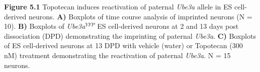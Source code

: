 \documentclass{beamer}
\begin{document}
\begin{frame}
\begin{columns}
{\begin{tikzpicture}[every label/.style={font=\Large\bfseries},pic/.style={inner sep=0pt}]
      \end{tikzpicture}
    }

    \begin{block}{\textbf{Figure 5.1}}
      Topotecan induces reactivation of paternal \emph{Ube3a} allele in ES cell-derived neurons. \textbf{A)} Boxplots of time course analysis of imprinted neurons (N = 10). \textbf{B)} Boxplots of \emph{Ube3a$^{YFP}$} ES cell-derived neurons at 2 and 13 days post dissociation (DPD) demonstrating the imprinting of paternal \emph{Ube3a}. \textbf{C)} Boxplots of ES cell-derived neurons at 13 DPD with vehicle (water) or Topotecan (300 nM) treatment demonstrating the reactivation of paternal \emph{Ube3a}. N = 15 neurons.
    \end{block}
  \end{columns}
\end{frame}
\end{document}
